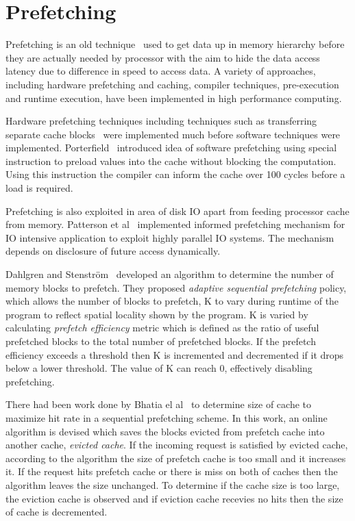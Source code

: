 \section{Prefetching}
Prefetching is an old technique~\cite{anacker68}\cite{Smith1982}\cite{Vanderwiel2000}
used to get data up in memory hierarchy before they are actually needed by processor
with the aim to hide the data access latency due to difference in speed to access
data. A variety of approaches, including hardware prefetching and caching, compiler
techniques, pre-execution and runtime execution, have been implemented in high
performance computing.

Hardware prefetching techniques including techniques such as transferring separate
cache blocks~\cite{Smith1978} were implemented much before software techniques were
implemented. Porterfield~\cite{Porterfield1989} introduced idea of software prefetching
using special instruction to preload values into the cache without blocking the
computation. Using this instruction the compiler can inform the cache over 100
cycles before a load is required.

Prefetching is also exploited in area of disk IO apart from feeding processor cache
from memory. Patterson et al~\cite{Patterson1994} implemented informed prefetching
mechanism for IO intensive application to exploit highly parallel IO systems. The
mechanism depends on disclosure of future access dynamically.

Dahlgren and Stenström~\cite{Dahlgren1993} developed an algorithm to determine the
number of memory blocks to prefetch. They proposed
\textit{adaptive sequential prefetching} policy, which allows the number of blocks
to prefetch, K to vary during runtime of the program to reflect spatial locality
shown by the program. K is varied by calculating \textit{prefetch efficiency} metric
which is defined as the ratio of useful prefetched blocks to the total number of
prefetched blocks. If the prefetch efficiency exceeds a threshold then K is
incremented and decremented if it drops below a lower threshold. The value of K
can reach 0, effectively disabling prefetching.

There had been work done by Bhatia el al~\cite{Bhatia2010} to determine size of
cache to maximize hit rate in a sequential prefetching scheme. In this work, an
online algorithm is devised which saves the blocks evicted from prefetch cache
into another cache, \textit{evicted cache}. If the incoming request is satisfied
by evicted cache, according to the algorithm the size of prefetch cache is too
small and it increases it. If the request hits prefetch cache or there is miss
on both of caches then the algorithm leaves the size unchanged. To determine if
the cache size is too large, the eviction cache is observed and if eviction cache
recevies no hits then the size of cache is decremented.